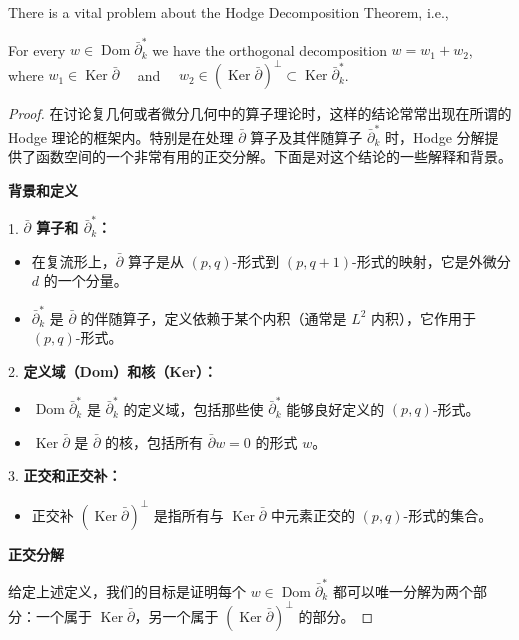 \documentclass[lang=cn,zihao=-4,a4paper,fontset=none]{beautybook}
\begin{document}
There is a vital problem about the Hodge Decomposition Theorem, i.e., 
\begin{fancybox}
    For every $w \in \operatorname{Dom} \bar{\partial}_k^*$ we have the orthogonal decomposition $w=w_1+w_2$, where $w_1 \in \operatorname{Ker} \bar{\partial} \quad$ and $\quad w_2 \in(\operatorname{Ker} \bar{\partial})^{\perp} \subset \operatorname{Ker} \bar{\partial}_k^*$.
\end{fancybox}
\begin{proof}

在讨论复几何或者微分几何中的算子理论时，这样的结论常常出现在所谓的 Hodge 理论的框架内。特别是在处理 $\bar{\partial}$ 算子及其伴随算子 $\bar{\partial}_k^*$ 时，Hodge 分解提供了函数空间的一个非常有用的正交分解。下面是对这个结论的一些解释和背景。

\textbf{背景和定义}

1. \textbf{$\bar{\partial}$ 算子和 $\bar{\partial}_k^*$：}
   \begin{itemize}
       \item 在复流形上，$\bar{\partial}$ 算子是从 $(p, q)$-形式到 $(p, q+1)$-形式的映射，它是外微分 $d$ 的一个分量。
       \item $\bar{\partial}_k^*$ 是 $\bar{\partial}$ 的伴随算子，定义依赖于某个内积（通常是 $L^2$ 内积），它作用于 $(p, q)$-形式。
   \end{itemize}

2. \textbf{定义域（Dom）和核（Ker）：}
   \begin{itemize}
       \item $\operatorname{Dom} \bar{\partial}_k^*$ 是 $\bar{\partial}_k^*$ 的定义域，包括那些使 $\bar{\partial}_k^*$ 能够良好定义的 $(p, q)$-形式。
       \item $\operatorname{Ker} \bar{\partial}$ 是 $\bar{\partial}$ 的核，包括所有 $\bar{\partial} w = 0$ 的形式 $w$。
   \end{itemize}

3. \textbf{正交和正交补：}
   \begin{itemize}
       \item 正交补 $(\operatorname{Ker} \bar{\partial})^\perp$ 是指所有与 $\operatorname{Ker} \bar{\partial}$ 中元素正交的 $(p, q)$-形式的集合。
   \end{itemize}

\textbf{正交分解}

给定上述定义，我们的目标是证明每个 $w \in \operatorname{Dom} \bar{\partial}_k^*$ 都可以唯一分解为两个部分：一个属于 $\operatorname{Ker} \bar{\partial}$，另一个属于 $(\operatorname{Ker} \bar{\partial})^\perp$ 的部分。


\end{proof}
\end{document}
